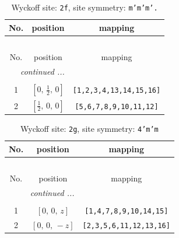 \documentclass[fleqn,8pt]{jsarticle}
\begin{document}
\renewcommand{\arraystretch}{1.2}
\begin{longtable}{ccc}
\caption{Wyckoff site: {\tt 2f}, site symmetry: {\tt m'm'm'.}}
 \\
 \hline \hline
No. & position & mapping \\ \hline \endfirsthead

\multicolumn{2}{l}{\tablename\ \thetable{}} \\
 \hline \hline
No. & position & mapping \\ \hline \endhead

 \hline \hline
\multicolumn{2}{r}{\footnotesize\it continued ...} \\ \endfoot

 \hline \hline
\multicolumn{2}{r}{} \\ \endlastfoot

1 & $\left[ 0,\, \frac{1}{2},\, 0 \right]$ & {\tt [1,2,3,4,13,14,15,16]} \\ \hline
2 & $\left[ \frac{1}{2},\, 0,\, 0 \right]$ & {\tt [5,6,7,8,9,10,11,12]} \\
\end{longtable}
\renewcommand{\arraystretch}{1.2}
\begin{longtable}{ccc}
\caption{Wyckoff site: {\tt 2g}, site symmetry: {\tt 4'm'm}}
 \\
 \hline \hline
No. & position & mapping \\ \hline \endfirsthead

\multicolumn{2}{l}{\tablename\ \thetable{}} \\
 \hline \hline
No. & position & mapping \\ \hline \endhead

 \hline \hline
\multicolumn{2}{r}{\footnotesize\it continued ...} \\ \endfoot

 \hline \hline
\multicolumn{2}{r}{} \\ \endlastfoot

1 & $\left[ 0,\, 0,\, z \right]$ & {\tt [1,4,7,8,9,10,14,15]} \\ \hline
2 & $\left[ 0,\, 0,\, - z \right]$ & {\tt [2,3,5,6,11,12,13,16]} \\
\end{longtable}
\renewcommand{\arraystretch}{1.2}
\end{document}
